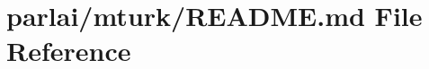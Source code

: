 \hypertarget{parlai_2mturk_2README_8md}{}\section{parlai/mturk/\+R\+E\+A\+D\+ME.md File Reference}
\label{parlai_2mturk_2README_8md}
